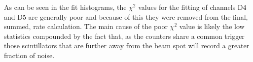 
As can be seen in the fit histograms, the \(\chi^2\) values for the fitting of channels D4 and D5 are generally poor and because of this they were removed from the final, summed, rate calculation. The main cause of the poor \(\chi^2\) value is likely the low statistics compounded by the fact that, as the counters share a common trigger those scintillators that are further away from the beam spot will record a greater fraction of noise.

%
%

